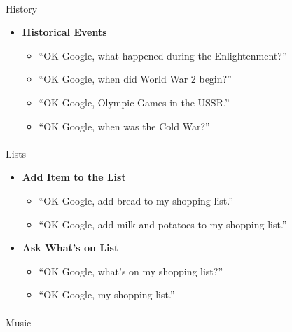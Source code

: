 \documentclass[
  a4paper,
]{article}
\makeatletter
\let\oldparagraph\paragraph
\renewcommand{\paragraph}{
    \@ifstar
      \xxxParagraphStar
      \xxxParagraphNoStar
  }
\newcommand{\xxxParagraphStar}[1]{\oldparagraph*{#1}\mbox{}}
\newcommand{\xxxParagraphNoStar}[1]{\oldparagraph{#1}\mbox{}}
\providecommand{\tightlist}{%
  \setlength{\itemsep}{0pt}\setlength{\parskip}{0pt}}\usepackage{longtable,booktabs,array}
\makeatother
\begin{document}
\paragraph{History}\label{history}

\begin{itemize}
\tightlist
\item
  \textbf{Historical Events}

  \begin{itemize}
  \tightlist
  \item
    ``OK Google, what happened during the Enlightenment?''
  \item
    ``OK Google, when did World War 2 begin?''
  \item
    ``OK Google, Olympic Games in the USSR.''
  \item
    ``OK Google, when was the Cold War?''
  \end{itemize}
\end{itemize}

\paragraph{Lists}\label{lists}

\begin{itemize}
\tightlist
\item
  \textbf{Add Item to the List}

  \begin{itemize}
  \tightlist
  \item
    ``OK Google, add bread to my shopping list.''
  \item
    ``OK Google, add milk and potatoes to my shopping list.''
  \end{itemize}
\item
  \textbf{Ask What's on List}

  \begin{itemize}
  \tightlist
  \item
    ``OK Google, what's on my shopping list?''
  \item
    ``OK Google, my shopping list.''
  \end{itemize}
\end{itemize}

\paragraph{Music}\label{music}
\end{document}
